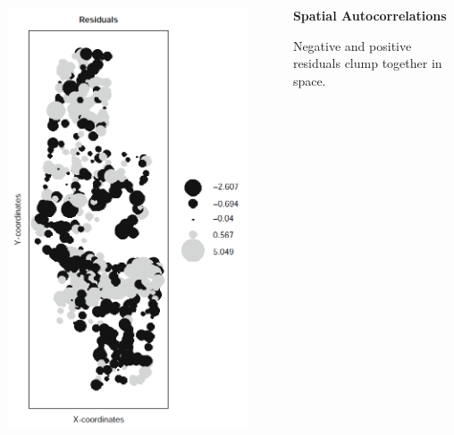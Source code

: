 \documentclass{beamer}
\begin{document}
\begin{frame}{}
  \begin{columns}
      \begin{column}{0.5\textwidth}
        \includegraphics[width=0.9\textwidth]{lectures/day_4_GLS/figures/spatial_residuals.png}
      \end{column}
      \begin{column}{0.5\textwidth}
        \textbf{Spatial Autocorrelations}
        \vspace{0.5cm}
        
        Negative and positive residuals clump together in space.
      \end{column}
  \end{columns}
\end{frame}
\end{document}
